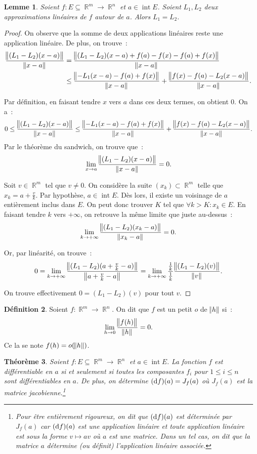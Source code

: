 \documentclass{article}
\DeclareMathOperator{\intr}{int}
\DeclareMathOperator{\R}{\mathbb R}
\newcommand{\frmrn}[2]{#1 : #2 \subseteq \R^m \to \R^n}
\newtheorem{thm}{Théorème}[section]
\newtheorem{lem}[thm]{Lemme}
\theoremstyle{definition}
\newtheorem{déf}[thm]{Définition}
\theoremstyle{remark}
\begin{document}
		\begin{lem} Soient $\frmrn fE$ et $a \in \intr E$. Soient $L_1, L_2$ deux approximations linéaires de $f$ autour de $a$. Alors $L_1 = L_2$. \end{lem}

		\begin{proof} On observe que la somme de deux applications linéaires reste une application linéaire. De plus, on trouve~:
		\begin{align*}
			\frac {\norm {(L_1-L_2)(x-a)}}{\norm{x-a}} &= \frac {\norm {(L_1-L_2)(x-a) + f(a) - f(x) - f(a) + f(x)}}{\norm {x-a}} \\
			&\leq \frac {\norm{-L_1(x-a)-f(a)+f(x)}}{\norm {x-a}} + \frac {\norm {f(x)-f(a)-L_2(x-a)}}{\norm {x-a}}.
		\end{align*}

		Par définition, en faisant tendre $x$ vers $a$ dans ces deux termes, on obtient 0. On a~:
		\[0 \leq \frac {\norm{(L_1-L_2)(x-a)}}{\norm{x-a}} \leq \frac {\norm{-L_1(x-a)-f(a)+f(x)}}{\norm {x-a}} + \frac {\norm {f(x)-f(a)-L_2(x-a)}}{\norm {x-a}}.\]
		Par le théorème du sandwich, on trouve que~:
		\[\lim_{x \to a}\frac {\norm{(L_1-L_2)(x-a)}}{\norm{x-a}} = 0.\]

		Soit $v \in \R^m$ tel que $v \neq 0$. On considère la suite $(x_k) \subset \R^m$ telle que $x_k = a + \frac vk$. Par hypothèse, $a \in \intr E$. Dès
		lors, il existe un voisinage de $a$ entièrement inclus dans $E$. On peut donc trouver $K$ tel que $\forall k > K : x_k \in E$. En faisant tendre $k$
		vers $+\infty$, on retrouve la même limite que juste au-dessus~:
		\[\lim_{k \to +\infty}\frac {\norm{(L_1-L_2)(x_k-a)}}{\norm{x_k-a}} = 0.\]

		Or, par linéarité, on trouve~:
		\[0 = \lim_{k \to +\infty}\frac {\norm{(L_1-L_2)(a+\frac vk-a)}}{\norm{a+\frac vk-a}}
		= \lim_{k \to +\infty}\frac {\frac 1k}{\frac 1k}\frac {\norm{(L_1-L_2)(v)}}{\norm v}.\]

		On trouve effectivement $0 = (L_1-L_2)(v)$ pour tout $v$.
		\end{proof}

		\begin{déf} Soient $f : \R^m \to \R^n$. On dit que $f$ est un petit $o$ de $\norm h$ si~:
		\[\lim_{h \to 0}\frac {\norm {f(h)}}{\norm h} = 0.\]
		Ce la se note $f(h) = o(\norm h)$.
		\end{déf}

		\begin{thm} Soient $\frmrn fE$ et $a \in \intr E$. La fonction $f$ est différentiable en $a$ si et seulement si toutes les composantes $f_i$ pour
		$1 \leq i \leq n$ sont différentiables en $a$. De plus, on détermine $(\dif f)(a) = J_f(a)$ où $J_f(a)$ est la matrice jacobienne.\footnote{
		Pour être entièrement rigoureux, on dit que $(\dif f)(a)$ est \emph{déterminée} par $J_f(a)$ car $(\dif f)(a)$ est une application linéaire et toute
		application linéaire est sous la forme $v \mapsto av$ où $a$ est une matrice. Dans un tel cas, on dit que la matrice $a$ détermine (ou définit)
		l'\emph{application linéaire associée}.}
		\end{thm}
\end{document}
